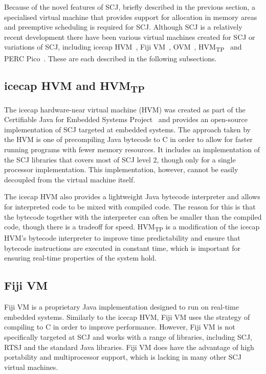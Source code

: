 \documentclass[a4paper,10pt]{report}
\begin{document}

Because of the novel features of SCJ, briefly described in the
previous section, a specialised virtual machine that provides support
for allocation in memory areas and preemptive scheduling is required
for SCJ.
Although SCJ is a relatively recent development there have been
various virtual machines created for SCJ or variations of SCJ,
including icecap HVM~\cite{sondergaard2012}, Fiji VM~\cite{pizlo2009},
OVM~\cite{armbruster2007}, HVM\textsubscript{TP}~\cite{luckow2014} and
PERC Pico~\cite{atego2015, richard2010}.
These are each described in the following subsections.

\subsection{icecap HVM and HVM\textsubscript{TP}}

The icecap hardware-near virtual machine (HVM) was created as part of
the Certifiable Java for Embedded Systems Project~\cite{schoeberl2014}
and provides an open-source implementation of SCJ targeted at embedded
systems.
The approach taken by the HVM is one of precompiling Java bytecode to
C in order to allow for faster running programs with fewer memory
resources.
It includes an implementation of the SCJ libraries that covers most of
SCJ level 2, though only for a single processor implementation.
This implementation, however, cannot be easily decoupled from the
virtual machine itself.

The icecap HVM also provides a lightweight Java bytecode interpreter
and allows for interpreted code to be mixed with compiled code.
The reason for this is that the bytecode together with the interpreter
can often be smaller than the compiled code, though there is a
tradeoff for speed.
HVM\textsubscript{TP} is a modification of the icecap HVM's bytecode
interpreter to improve time predictability and ensure that bytecode
instructions are executed in constant time, which is important for
ensuring real-time properties of the system hold.

\subsection{Fiji VM}

Fiji VM is a proprietary Java implementation designed to run on
real-time embedded systems.
Similarly to the icecap HVM, Fiji VM uses the strategy of compiling to
C in order to improve performance.
However, Fiji VM is not specifically targeted at SCJ and works with a
range of libraries, including SCJ, RTSJ and the standard Java
libraries.
Fiji VM does have the advantage of high portability and multiprocessor
support, which is lacking in many other SCJ virtual machines.
\end{document}
